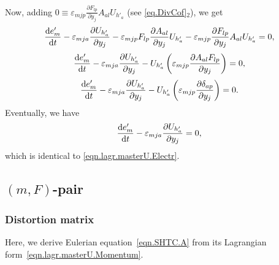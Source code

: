 \documentclass[twoside]{article}
\newcommand{\pd}{\partial}
\newcommand{\rmd}{{\rm d}}
\begin{document}
Now, adding $0\equiv \varepsilon _{{mjp}}\frac{\pd  F_{{lp}}}{\pd 
y_j} A_{{al}}   U_{h'_a}$ (see \eqref{eq.DivCof}$_2$), we get
\begin{equation}
\frac{\rmd e'_m}{{\rmd t}} - \varepsilon _{{mja}}\frac{\pd   
U_{h'_a}}{\pd  y_j}-\varepsilon _{{mjp}}F_{{lp}}\frac{\pd 
A_{{al}}}{\pd  y_j} U_{h'_a}-\varepsilon _{{mjp}}\frac{\pd  
F_{{lp}}}{\pd y_j}A_{{al}}  U_{h'_a}=0,
\end{equation}
\begin{equation}
\frac{\rmd e'_m}{{\rmd t}} - \varepsilon _{{mja}}\frac{\pd   
U_{h'_a}}{\pd  y_j} -   U_{h'_a}\left(\varepsilon _{{mjp}}\frac{\pd
A_{{al}}F_{{lp}}}{\pd  y_j}\right)=0,
\end{equation}
\begin{equation}
\frac{\rmd e'_m}{{\rmd t}} - \varepsilon _{{mja}}\frac{\pd   
U_{h'_a}}{\pd  y_j} -   U_{h'_a}\left(\varepsilon _{{mjp}}\frac{\pd 
\delta _{{ap}}}{\pd  y_j}\right)=0.
\end{equation}
Eventually, we have 
\begin{equation}
\frac{\rmd e'_m}{{\rmd t}} - \varepsilon _{{mja}}\frac{\pd    
U_{h'_a}}{\pd  y_j}=0,
\end{equation}
which is identical to \eqref{eqn.lagr.masterU.Electr}.


\subsection{$ (m,F) $-pair}

\subsubsection{Distortion matrix}
Here, we derive Eulerian equation~\eqref{eqn.SHTC.A} from its Lagrangian 
form~\eqref{eqn.lagr.masterU.Momentum}.
\end{document}
